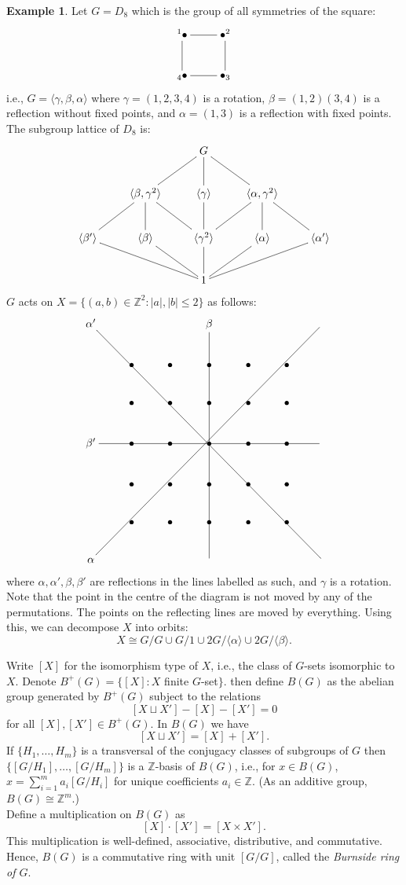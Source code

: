 \documentclass[12pt]{amsart}
\theoremstyle{definition}
\newtheorem{example}[theorem]{Example}
\newcommand{\Size}[1]{\left| #1 \right|}
\begin{document}
\begin{example}
\label{D8}
Let $G=D_8$ which is the group of all symmetries of the square:
$$\xymatrix{^1{\bullet} \ar@{-}[r] \ar@{-}[d] & {\bullet}^2 \\ _4{\bullet} & {\bullet}_3 \ar@{-}[l] \ar@{-}[u]}$$
i.e., $G=\langle\gamma,\beta,\alpha\rangle$ where $\gamma=(1,2,3,4)$ is a rotation, $\beta=(1,2)(3,4)$ is a reflection without fixed points, and $\alpha=(1,3)$ is a reflection with fixed points.  The subgroup lattice of $D_8$ is:
$$\xymatrix{&& G \ar@{-}[dl] \ar@{-}[d] \ar@{-}[dr]\\
& \langle\beta,\gamma^2\rangle \ar@{-}[dl] \ar@{-}[d] \ar@{-}[dr] & \langle\gamma\rangle \ar@{-}[d] & \langle\alpha,\gamma^2\rangle \ar@{-}[dl] \ar@{-}[d] \ar@{-}[dr] \\
\langle\beta'\rangle \ar@{-}[drr] & \langle\beta\rangle \ar@{-}[dr] & \langle\gamma^2\rangle \ar@{-}[d] & \langle\alpha\rangle \ar@{-}[dl] & \langle\alpha'\rangle \ar@{-}[dll] \\
&& 1}$$
$G$ acts on $X=\{(a,b)\in\mathbb{Z}^2:\Size{a},\Size{b}\leq2\}$ as follows:
$$\xymatrix{ {\alpha'} \ar@{-}[ddddddrrrrrr] &&& {\beta}\ar@{-}[dddddd] &&& \\
& {\bullet} & {\bullet} & {\bullet} & {\bullet} & {\bullet} \\
& {\bullet} & {\bullet} & {\bullet} & {\bullet} & {\bullet} \\
{\beta'} \ar@{-}[rrrrrr] & {\bullet} & {\bullet} & {\bullet} & {\bullet} & {\bullet} & \\
& {\bullet} & {\bullet} & {\bullet} & {\bullet} & {\bullet} \\
& {\bullet} & {\bullet} & {\bullet} & {\bullet} & {\bullet} \\
{\alpha} \ar@{-}[uuuuuurrrrrr] &&&&&&}$$
where $\alpha, \alpha', \beta, \beta'$ are reflections in the lines labelled as such, and $\gamma$ is a rotation.  Note that the point in the centre of the diagram is not moved by any of the permutations.  The points on the reflecting lines are moved by everything.  Using this, we can decompose $X$ into orbits:
$$X\cong G/G\cup G/1\cup 2G/\langle\alpha\rangle\cup 2G/\langle\beta\rangle.$$
\end{example}

Write $[X]$ for the isomorphism type of $X$, i.e., the class of $G$-sets isomorphic to $X$.  Denote $B^+(G)=\{[X]:X$ finite $G$-set$\}$.  then define $B(G)$ as the abelian group generated by $B^+(G)$ subject to the relations
$$[X\sqcup X']-[X]-[X']=0$$
for all $[X], [X']\in B^+(G)$.  In $B(G)$ we have
$$[X\sqcup X']=[X]+[X'].$$
If $\{H_1,\ldots,H_m\}$ is a transversal of the conjugacy classes of subgroups of $G$ then $\{[G/H_1],\ldots,[G/H_m]\}$ is a $\mathbb{Z}$-basis of $B(G)$, i.e., for $x\in B(G)$, $x=\sum_{i=1}^m a_i[G/H_i]$ for unique coefficients $a_i\in\mathbb{Z}$.  (As an additive group, $B(G)\cong\mathbb{Z}^m$.)\\
Define a multiplication on $B(G)$ as
$$[X]\cdot [X']=[X\times X'].$$
This multiplication is well-defined, associative, distributive, and commutative.  Hence, $B(G)$ is a commutative ring with unit $[G/G]$, called the \emph{Burnside ring of $G$}.
\end{document}
